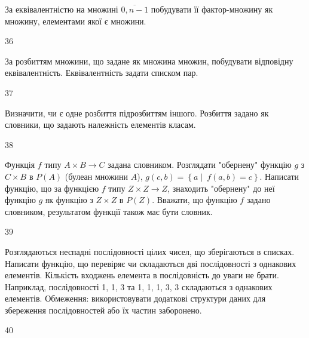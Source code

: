 За еквівалентністю на множині $\overline{0,n-1}$ побудувати її фактор-множину як множину, елементами якої є множини.
\\\par
36 














За розбиттям множини, що задане як множина множин, побудувати відповідну еквівалентність. Еквівалентність задати списком пар.
\\\par
37 














Визначити, чи є одне розбиття підрозбиттям іншого. Розбиття задано як словники, що задають належність елементів класам.
\\\par
38 














Функція $f$ типу $A\times B \rightarrow C$ задана словником. Розглядати "обернену" функцію $g$ з $C \times B$  в $P(A)$ (булеан множини $A$), $g\left(c, b\right)=\left\{a\middle|\ f\left(a,b\right)=c\right\}$. Написати функцію, що за функцією $f$ типу $Z\times Z \rightarrow Z$, знаходить "обернену" до неї функцію $g$ як функцію з $Z\times Z$ в $P(Z)$. Вважати, що функцію $f$ задано словником, результатом функції також має бути словник.
\\\par
39 














Розглядаються неспадні послідовності цілих чисел, що зберігаються в списках. Написати функцію, що перевіряє чи складаються дві послідовності з однакових елементів. Кількість входжень елемента в послідовність до уваги не брати. Наприклад, послідовності 1, 1, 3 та 1, 1, 1, 3, 3 складаються з однакових елементів. Обмеження: використовувати додаткові структури даних для збереження послідовностей або їх частин заборонено.
\\\par
40 














